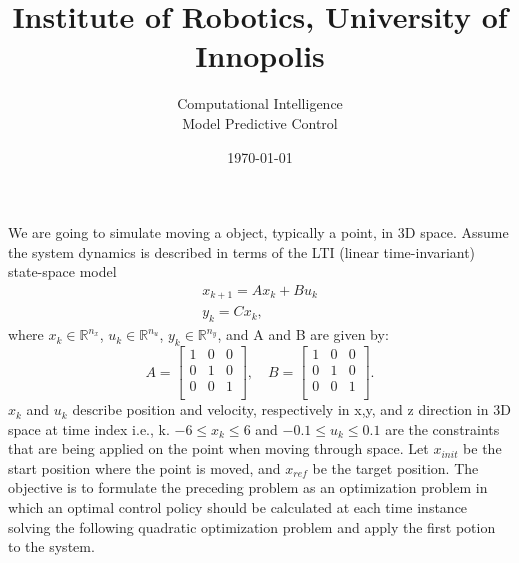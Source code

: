 \documentclass[12pt]{article}%
\begin{document}
\title{Institute of Robotics,  University of Innopolis}
\author{Computational Intelligence \\ Model Predictive Control }
\date{\today}
\maketitle


We are going to simulate moving a object, typically a point, in 3D space. Assume the system dynamics is described in terms of the LTI (linear time-invariant) state-space model 
\begin{equation} \label{dynamics}
   \begin{aligned}
    x_{k+1} = Ax_k + Bu_k \\
    y_k = Cx_k,
   \end{aligned}
\end{equation} where $x_k \in \mathbb{R}^{n_x}$, $u_k \in \mathbb{R}^{n_u}$, $y_k \in \mathbb{R}^{n_y}$, and A and B are given by:
\begin{equation} \label{eq1}
   A = \begin{bmatrix}
1 & 0 & 0\\ 
0 & 1 & 0\\ 
0 & 0 & 1\\ 
\end{bmatrix}, \quad B =  \begin{bmatrix}
1 & 0 & 0\\ 
0 & 1 & 0\\ 
0 & 0 & 1\\ 
\end{bmatrix}.
\end{equation}$x_k$ and $u_k$ describe position and velocity, respectively in x,y, and z direction in 3D space at time index i.e., k. $-6\leq x_k \leq 6$ and $-0.1\leq u_k \leq 0.1$ are the constraints that are being applied on the point when moving through space. Let $x_{init}$ be the start position where the point is moved, and $x_{ref}$ be the target position. The objective is to formulate the preceding problem as an optimization problem in which an optimal control policy should be calculated at each time instance solving the following quadratic optimization problem and apply the first potion to the system. 
\end{document}
